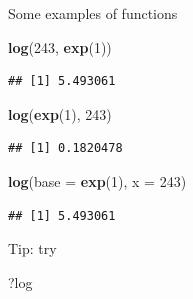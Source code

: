 \documentclass[ignorenonframetext,]{beamer}
\newenvironment{Shaded}{\begin{snugshade}}{\end{snugshade}}
\newcommand{\DataTypeTok}[1]{\textcolor[rgb]{0.13,0.29,0.53}{#1}}
\newcommand{\DecValTok}[1]{\textcolor[rgb]{0.00,0.00,0.81}{#1}}
\newcommand{\KeywordTok}[1]{\textcolor[rgb]{0.13,0.29,0.53}{\textbf{#1}}}
\newcommand{\NormalTok}[1]{#1}
\begin{document}
\begin{frame}[fragile]{Some examples of functions}
\protect\hypertarget{some-examples-of-functions-2}{}

\begin{Shaded}
\begin{Highlighting}[]
\KeywordTok{log}\NormalTok{(}\DecValTok{243}\NormalTok{, }\KeywordTok{exp}\NormalTok{(}\DecValTok{1}\NormalTok{))}
\end{Highlighting}
\end{Shaded}

\begin{verbatim}
## [1] 5.493061
\end{verbatim}

\begin{Shaded}
\begin{Highlighting}[]
\KeywordTok{log}\NormalTok{(}\KeywordTok{exp}\NormalTok{(}\DecValTok{1}\NormalTok{), }\DecValTok{243}\NormalTok{)}
\end{Highlighting}
\end{Shaded}

\begin{verbatim}
## [1] 0.1820478
\end{verbatim}

\begin{Shaded}
\begin{Highlighting}[]
\KeywordTok{log}\NormalTok{(}\DataTypeTok{base =} \KeywordTok{exp}\NormalTok{(}\DecValTok{1}\NormalTok{), }\DataTypeTok{x =} \DecValTok{243}\NormalTok{)}
\end{Highlighting}
\end{Shaded}

\begin{verbatim}
## [1] 5.493061
\end{verbatim}

Tip: try

\begin{Shaded}
\begin{Highlighting}[]
\NormalTok{?log}
\end{Highlighting}
\end{Shaded}

\end{frame}
\end{document}
